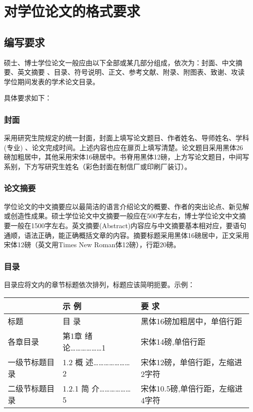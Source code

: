 \section{对学位论文的格式要求}

\subsection{编写要求}

硕士、博士学位论文一般应由以下全部或某几部分组成，依次为：封面、中文摘要、英文摘要 、目录、符号说明、正文、参考文献、附录、附图表、致谢、攻读学位期间发表的学术论文目录。

具体要求如下：

\subsubsection{封面}

采用研究生院规定的统一封面，封面上填写论文题目、作者姓名、导师姓名、学科(专业) 、论文完成时间。上述内容也应在扉页上填写清楚。论文题目采用黑体26磅加粗居中，其他采用宋体16磅居中。书脊用黑体12磅，上方写论文题目，中间写系别，下方写研究生姓名（彩色封面在制信厂或印刷厂装订）。

\subsubsection{论文摘要}

学位论文的中文摘要应以最简洁的语言介绍论文的概要、作者的突出论点、新见解或创造性成果。硕士学位论文中文摘要一般应在500字左右，博士学位论文中文摘要一般在1500字左右。英文摘要(Abstract)内容应与中文摘要基本相对应，要语句通顺，语法正确，能正确概括文章的内容。摘要标题采用黑体16磅居中，正文采用宋体12磅（英文用Times New Roman体12磅），行距20磅。

\subsubsection{目录}

目录应将文内的章节标题依次排列，标题应该简明扼要。示例：\\
\begin{tabular}{|l|l|l|}
	\hline
	& 示  例 &  要  求\\
	\hline
	标题	& 目  录	& 黑体16磅加粗居中，单倍行距 \\
	\hline
	各章目录 & 第1章 绪  论………………1 & 宋体14磅,单倍行距 \\
	\hline
	一级节标题目录 & 1.2 概  述…………………2	 & 宋体12磅，单倍行距，左缩进2字符 \\
	\hline
	二级节标题目录 & 1.2.1 简  介………………5 & 宋体10.5磅,单倍行距，左缩进4字符\\
	\hline
\end{tabular}

